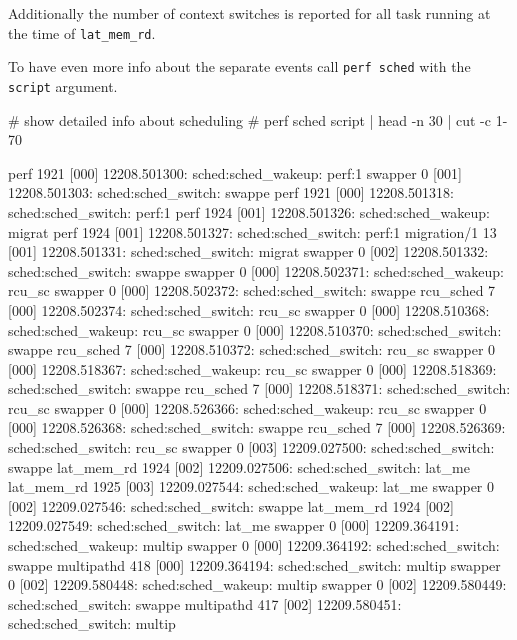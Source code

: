 \stoptyping

Additionally the number of context switches is reported for all task
running at the time of {\tt lat_mem_rd}.

To have even more info about the separate events call {\tt perf sched}
with the {\tt script} argument.

\starttyping
# show detailed info about scheduling
# perf sched script | head -n 30 | cut -c 1-70

            perf  1921 [000] 12208.501300:  sched:sched_wakeup: perf:1
         swapper     0 [001] 12208.501303:  sched:sched_switch: swappe
            perf  1921 [000] 12208.501318:  sched:sched_switch: perf:1
            perf  1924 [001] 12208.501326:  sched:sched_wakeup: migrat
            perf  1924 [001] 12208.501327:  sched:sched_switch: perf:1
     migration/1    13 [001] 12208.501331:  sched:sched_switch: migrat
         swapper     0 [002] 12208.501332:  sched:sched_switch: swappe
         swapper     0 [000] 12208.502371:  sched:sched_wakeup: rcu_sc
         swapper     0 [000] 12208.502372:  sched:sched_switch: swappe
       rcu_sched     7 [000] 12208.502374:  sched:sched_switch: rcu_sc
         swapper     0 [000] 12208.510368:  sched:sched_wakeup: rcu_sc
         swapper     0 [000] 12208.510370:  sched:sched_switch: swappe
       rcu_sched     7 [000] 12208.510372:  sched:sched_switch: rcu_sc
         swapper     0 [000] 12208.518367:  sched:sched_wakeup: rcu_sc
         swapper     0 [000] 12208.518369:  sched:sched_switch: swappe
       rcu_sched     7 [000] 12208.518371:  sched:sched_switch: rcu_sc
         swapper     0 [000] 12208.526366:  sched:sched_wakeup: rcu_sc
         swapper     0 [000] 12208.526368:  sched:sched_switch: swappe
       rcu_sched     7 [000] 12208.526369:  sched:sched_switch: rcu_sc
         swapper     0 [003] 12209.027500:  sched:sched_switch: swappe
      lat_mem_rd  1924 [002] 12209.027506:  sched:sched_switch: lat_me
      lat_mem_rd  1925 [003] 12209.027544:  sched:sched_wakeup: lat_me
         swapper     0 [002] 12209.027546:  sched:sched_switch: swappe
      lat_mem_rd  1924 [002] 12209.027549:  sched:sched_switch: lat_me
         swapper     0 [000] 12209.364191:  sched:sched_wakeup: multip
         swapper     0 [000] 12209.364192:  sched:sched_switch: swappe
      multipathd   418 [000] 12209.364194:  sched:sched_switch: multip
         swapper     0 [002] 12209.580448:  sched:sched_wakeup: multip
         swapper     0 [002] 12209.580449:  sched:sched_switch: swappe
      multipathd   417 [002] 12209.580451:  sched:sched_switch: multip
\stoptyping

